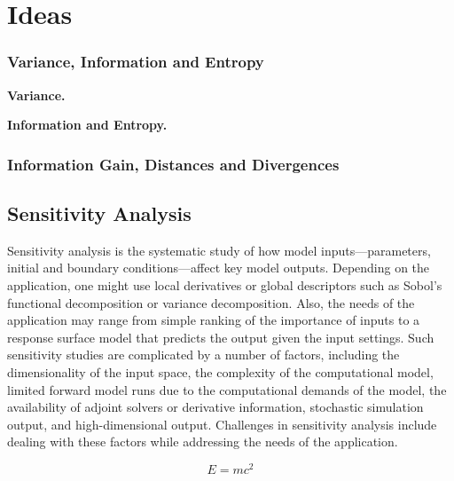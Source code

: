\chapter{Ideas}\label{apendiceB}

\subsection{Variance, Information and Entropy}

\textbf{Variance.} 

\textbf{Information and Entropy.}

\subsection{Information Gain, Distances and Divergences}

\section{Sensitivity Analysis}
Sensitivity analysis is the systematic study of how model inputs—parameters, initial and boundary conditions—affect key model outputs. Depending on the application, one might use local derivatives or global descriptors such as Sobol’s functional decomposition or variance decomposition. Also, the needs of the application may range from simple ranking of the importance of inputs to a response surface model that predicts the output given the input settings. Such sensitivity studies are complicated by a number of factors, including the dimensionality of the input space, the complexity of the computational model, limited forward model runs due to the computational demands of the model, the availability of adjoint solvers or derivative information, stochastic simulation output, and high-dimensional output. Challenges in sensitivity analysis include dealing with these factors while addressing the needs of the application. \cite{DEnergy2009}

\begin{equation}
E=mc^2
\end{equation}

\lipsum[55-57]
